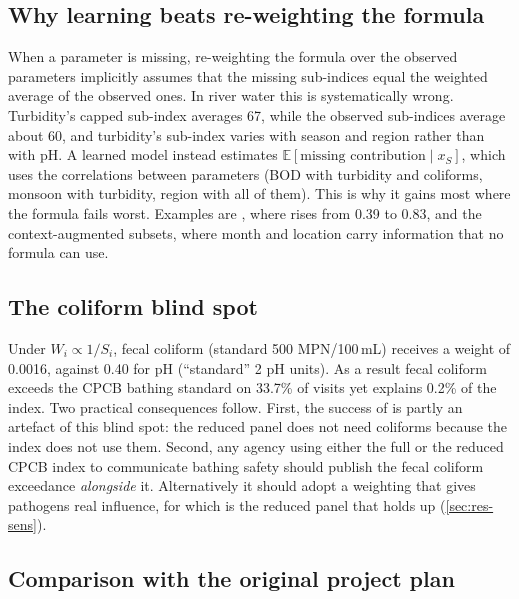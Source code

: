 \subsection{Why learning beats re-weighting the formula}

When a parameter is missing, re-weighting the formula over the observed parameters implicitly assumes that the missing sub-indices equal the weighted average of the observed ones. In river water this is systematically wrong. Turbidity's capped sub-index averages 67, while the observed  sub-indices average about 60, and turbidity's sub-index varies with season and region rather than with pH. A learned model instead estimates $\mathbb{E}[\text{missing contribution}\mid x_S]$, which uses the correlations between parameters (BOD with turbidity and coliforms, monsoon with turbidity, region with all of them). This is why it gains most where the formula fails worst. Examples are , where \R{} rises from 0.39 to 0.83, and the context-augmented subsets, where month and location carry information that no formula can use.

\subsection{The coliform blind spot}

Under $W_i\propto 1/S_i$, fecal coliform (standard 500 MPN/100\,mL) receives a weight of 0.0016, against 0.40 for pH (``standard'' 2 pH units). As a result fecal coliform exceeds the CPCB bathing standard on 33.7\% of visits yet explains 0.2\% of the index. Two practical consequences follow. First, the success of  is partly an artefact of this blind spot: the reduced panel does not need coliforms because the index does not use them. Second, any agency using either the full or the reduced CPCB index to communicate bathing safety should publish the fecal coliform exceedance \emph{alongside} it. Alternatively it should adopt a weighting that gives pathogens real influence, for which  is the reduced panel that holds up (\cref{sec:res-sens}).

\iffull\subsection{Comparison with the original project plan}

